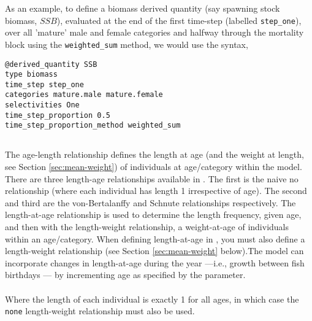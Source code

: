 As an example, to define a biomass derived quantity (say spawning stock biomass, $SSB$), evaluated at the end of the first time-step (labelled \texttt{step\_one}), over all 'mature' male and female categories and halfway through the mortality block using the \texttt{weighted\_sum} method, we would use the syntax,

{\small{\begin{verbatim}
@derived_quantity SSB
type biomass
time_step step_one
categories mature.male mature.female
selectivities One
time_step_proportion 0.5
time_step_proportion_method weighted_sum
\end{verbatim}}}

\subsection{\label{sec:age-at-age}}

The age-length relationship defines the length at age (and the weight at length, see Section \ref{sec:mean-weight}) of individuals at age/category within the model. There are three length-age relationships available in \CNAME. The first is the naive no relationship (where each individual has length 1 irrespective of age). The second  and third are the von-Bertalanffy and Schnute relationships respectively. The length-at-age relationship is used to determine the length frequency, given age, and then with the length-weight relationship, a weight-at-age of individuals within an age/category. When defining length-at-age in \CNAME, you must also define a length-weight relationship (see Section \ref{sec:mean-weight} below).The model can incorporate changes in length-at-age during the year —i.e., growth between fish birthdays — by incrementing age as specified by the  parameter.

\paragraph[None]{}
Where the length of each individual is exactly 1 for all ages, in which case the \texttt{none} length-weight relationship must also be used.

